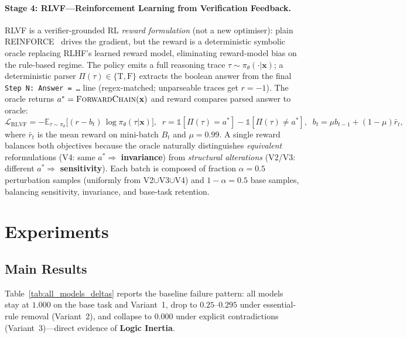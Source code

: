 \documentclass{article}
\begin{document}
\paragraph{Stage 4: \textsc{RLVF}---Reinforcement Learning from Verification Feedback.}
\textsc{RLVF} is a verifier-grounded RL \emph{reward formulation} (not a new optimiser): plain REINFORCE~\citep{williams1992simple} drives the gradient, but the reward is a deterministic symbolic oracle replacing RLHF's learned reward model, eliminating reward-model bias on the rule-based regime. The policy emits a full reasoning trace $\tau\sim\pi_\theta(\cdot|\mathbf{x})$; a deterministic parser $\Pi(\tau)\in\{\text{T},\text{F}\}$ extracts the boolean answer from the final \texttt{Step\,N: Answer = \dots} line (regex-matched; unparseable traces get $r=-1$). The oracle returns $a^*=\textsc{ForwardChain}(\mathbf{x})$ and reward compares parsed answer to oracle:
\begin{equation}
\mathcal{L}_{\mathrm{RLVF}} = -\mathbb{E}_{\tau \sim \pi_\theta}\!\bigl[(r - b_t)\,\log\pi_\theta(\tau|\mathbf{x})\bigr],\;\; r=\mathbb{1}[\Pi(\tau){=}a^*]-\mathbb{1}[\Pi(\tau){\neq}a^*],\;\; b_t=\mu b_{t-1}+(1-\mu)\bar r_t,
\label{eq:rlvf}
\end{equation}
where $\bar r_t$ is the mean reward on mini-batch $B_t$ and $\mu=0.99$. A single reward balances both objectives because the oracle naturally distinguishes \emph{equivalent} reformulations (V4: same $a^*\Rightarrow$ \textbf{invariance}) from \emph{structural alterations} (V2/V3: different $a^*\Rightarrow$ \textbf{sensitivity}). Each batch is composed of fraction $\alpha=0.5$ perturbation samples (uniformly from V2$\cup$V3$\cup$V4) and $1-\alpha=0.5$ base samples, balancing sensitivity, invariance, and base-task retention.

\section{Experiments}

\subsection{Main Results}
Table~\ref{tab:all_models_deltas} reports the baseline failure pattern: all models stay at $1.000$ on the base task and Variant~1, drop to $0.25$--$0.295$ under essential-rule removal (Variant~2), and collapse to $0.000$ under explicit contradictions (Variant~3)---direct evidence of \textbf{Logic Inertia}.
\end{document}
